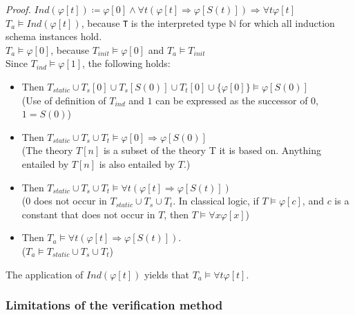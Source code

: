 \documentclass[10pt,a4paper]{article}
\theoremstyle{definition}
\begin{document}
\textit{Proof.} $Ind(\varphi[t]) \coloneqq \varphi[0] \land \forall t(\varphi[t] \Rightarrow \varphi[S(t)]) \Rightarrow \forall t \varphi[t]$ \\

$T_a \models Ind(\varphi[t])$, because \texttt{T} is the interpreted type $\mathbb{N}$ for which all induction schema instances hold. \\

$T_a \models \varphi[0]$, because $T_{init} \models \varphi[0]$ and $T_a \models T_{init}$\\

Since $T_{ind} \models \varphi[1]$, the following holds:
\begin{itemize}
	\item Then $T_{static} \cup T_s[0] \cup T_s[S(0)] \cup T_t[0] \cup \{\varphi[0]\} \models \varphi[S(0)]$ \\
	
	(Use of definition of $T_{ind}$ and $1$ can be expressed as the successor of $0$, $1 = S(0)$)
	\item Then $T_{static} \cup T_s \cup T_t \models \varphi[0] \Rightarrow \varphi[S(0)]$\\
	
	(The theory $T[n]$ is a subset of the theory T it is based on. Anything entailed by $T[n]$ is also entailed by $T$.)	
	\item Then $T_{static} \cup T_s \cup T_t \models \forall t (\varphi[t] \Rightarrow \varphi[S(t)])$\\
	
	($0$ does not occur in $T_{static} \cup T_s \cup T_t$. In classical logic, if $T \models \varphi[c]$, and $c$ is a constant that does not occur in $T$, then $T \models \forall x \varphi[x]$)
	\item Then $T_a \models \forall t (\varphi[t] \Rightarrow \varphi [S(t)]).$ \\
	
	($T_a \models T_{static} \cup T_s \cup T_t$)
\end{itemize}

The application of $Ind(\varphi[t])$ yields that $T_a \models \forall t \varphi[t].$

\subsubsection{Limitations of the verification method}
\end{document}

